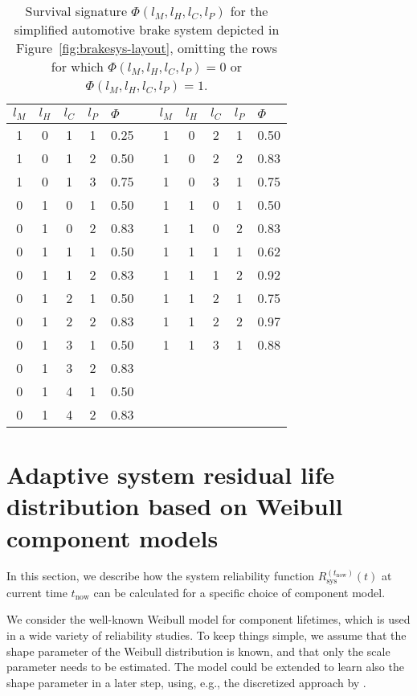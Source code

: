 \documentclass[authoryear]{elsarticle}
\def\tnow{t_\text{now}}
\newcommand{\Rsysnow}{R^{(t_\text{now})}_\text{sys}}
\begin{document}
\begin{table}
\centering
\begin{tabular}{cccclcccccl}
  \toprule
$l_M$ & $l_H$ & $l_C$ & $l_P$ & $\Phi$ & \quad & $l_M$ & $l_H$ & $l_C$ & $l_P$ & $\Phi$\\ 
  \midrule
1 & 0 & 1 & 1 & 0.25 & & 1 & 0 & 2 & 1 & 0.50 \\ 
1 & 0 & 1 & 2 & 0.50 & & 1 & 0 & 2 & 2 & 0.83 \\ 
1 & 0 & 1 & 3 & 0.75 & & 1 & 0 & 3 & 1 & 0.75 \\ 
0 & 1 & 0 & 1 & 0.50 & & 1 & 1 & 0 & 1 & 0.50 \\ 
0 & 1 & 0 & 2 & 0.83 & & 1 & 1 & 0 & 2 & 0.83 \\ 
0 & 1 & 1 & 1 & 0.50 & & 1 & 1 & 1 & 1 & 0.62 \\ 
0 & 1 & 1 & 2 & 0.83 & & 1 & 1 & 1 & 2 & 0.92 \\ 
0 & 1 & 2 & 1 & 0.50 & & 1 & 1 & 2 & 1 & 0.75 \\ 
0 & 1 & 2 & 2 & 0.83 & & 1 & 1 & 2 & 2 & 0.97 \\ 
0 & 1 & 3 & 1 & 0.50 & & 1 & 1 & 3 & 1 & 0.88 \\ 
0 & 1 & 3 & 2 & 0.83 \\
0 & 1 & 4 & 1 & 0.50 \\
0 & 1 & 4 & 2 & 0.83 \\
   \bottomrule
\end{tabular}
\caption{Survival signature $\Phi(l_M, l_H, l_C, l_P)$
for the simplified automotive brake system depicted in Figure~\ref{fig:brakesys-layout},
omitting the rows for which $\Phi(l_M, l_H, l_C, l_P) = 0$ or $\Phi(l_M, l_H, l_C, l_P) = 1$.}
\label{tab:brakesys-survsign}
\end{table}


\section{Adaptive system residual life distribution based on Weibull component models}
\label{sec:adaptive-sysrel-weibull}

In this section, we describe how the system reliability function $\Rsysnow(t)$ at current time $\tnow$ 
can be calculated for a specific choice of component model.

We consider the well-known Weibull model for component lifetimes,
which is used in a wide variety of reliability studies. 
To keep things simple, we assume that the shape parameter of the Weibull distribution is known,
and that only the scale parameter needs to be estimated.
The model could be extended to learn also the shape parameter in a later step,
using, e.g., the discretized approach by \cite{1969:soland}.
\end{document}
